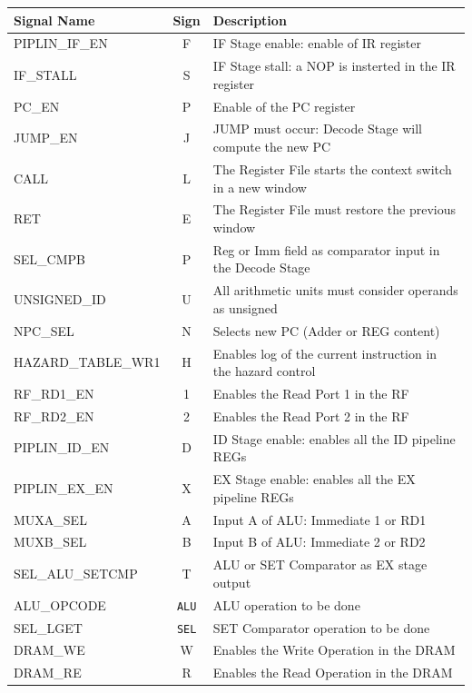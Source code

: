 \begin{table}[H]
    \centering
    \begin{tabular}{l|c|l}
        \textbf{Signal Name} & Sign & \textbf{Description}\\
        \hline
        PIPLIN\_IF\_EN & F & IF Stage enable: enable of IR register \\
        IF\_STALL & S & IF Stage stall: a NOP is insterted in the IR register \\
        PC\_EN & P & Enable of the PC register \\
        JUMP\_EN & J & JUMP must occur: Decode Stage will compute the new PC \\
        CALL & L & The Register File starts the context switch in a new window\\
        RET & E & The Register File must restore the previous window\\
        SEL\_CMPB & P & Reg or Imm field as comparator input in the Decode Stage\\
        UNSIGNED\_ID & U & All arithmetic units must consider operands as unsigned\\
        NPC\_SEL & N & Selects new PC (Adder or REG content)\\
        HAZARD\_TABLE\_WR1 & H & Enables log of the current instruction in the hazard control\\
        RF\_RD1\_EN & 1 & Enables the Read Port 1 in the RF\\
        RF\_RD2\_EN & 2 & Enables the Read Port 2 in the RF\\
        PIPLIN\_ID\_EN & D & ID Stage enable: enables all the ID pipeline REGs\\
        PIPLIN\_EX\_EN & X & EX Stage enable: enables all the EX pipeline REGs\\
        MUXA\_SEL & A & Input A of ALU: Immediate 1 or RD1\\
        MUXB\_SEL & B & Input B of ALU: Immediate 2 or RD2\\
        SEL\_ALU\_SETCMP & T & ALU or SET Comparator as EX stage output\\
        ALU\_OPCODE & \texttt{ALU} & ALU operation to be done\\
        SEL\_LGET & \texttt{SEL} & SET Comparator operation to be done\\
        DRAM\_WE & W & Enables the Write Operation in the DRAM\\
        DRAM\_RE & R & Enables the Read Operation in the DRAM\\

\end{tabular}
\end{table}
